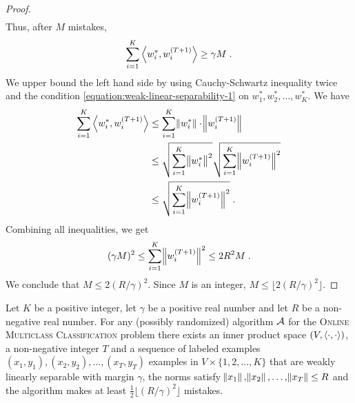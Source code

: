 \begin{proof}
\begin{align*}
\end{align*}
\endgroup
Thus, after $M$ mistakes,
$$
\sum_{i=1}^K \left\langle w_i^*, w_i^{(T+1)} \right\rangle \ge \gamma M \; .
$$
We upper bound the left hand side by using Cauchy-Schwartz inequality twice and
the condition \eqref{equation:weak-linear-separability-1} on $w_1^*, w_2^*, \dots,
w_K^*$. We have
\begin{align*}
\sum_{i=1}^K \left\langle w_i^*, w_i^{(T+1)} \right\rangle
& \le \sum_{i=1}^K \norm{w_i^*} \cdot \norm{w_i^{(T+1)}} \\
& \le \sqrt{\sum_{i=1}^K \norm{w_i^*}^2} \sqrt{\sum_{i=1}^K \norm{w_i^{(T+1)}}^2} \\
& \le \sqrt{\sum_{i=1}^K \norm{w_i^{(T+1)}}^2} \; .
\end{align*}
Combining all inequalities, we get
$$
(\gamma M)^2 \le \sum_{i=1}^K \norm{w_i^{(T+1)}}^2 \le 2R^2 M \; .
$$
We conclude that $M \le 2(R/\gamma)^2$. Since $M$ is an integer, $M \le \lfloor 2(R/\gamma)^2 \rfloor$.
\end{proof}


\begin{theorem}
\label{theorem:online-multiclass-classification-mistake-lower-bound}
Let $K$ be a positive integer, let $\gamma$ be a positive real number and let
$R$ be a non-negative real number. For any (possibly randomized) algorithm
$\mathcal{A}$ for the \textsc{Online Multiclass Classification} problem there exists
an inner product space $(V, \left\langle \cdot, \cdot \right\rangle)$, a non-negative integer $T$ and
a sequence of labeled examples $(x_1, y_1), (x_2, y_2), \dots, (x_T, y_T)$
examples in $V \times \{1,2,\dots,K\}$ that are weakly linearly separable with
margin $\gamma$, the norms satisfy $\norm{x_1}, \norm{x_2}, \dots, \norm{x_T}
\le R$ and the algorithm makes at least $\frac 1 2 \lfloor (R/\gamma)^2 \rfloor$
mistakes.
\end{theorem}

